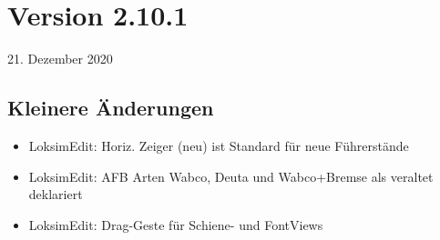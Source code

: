 \section{Version 2.10.1}\hfill 21. Dezember 2020

\subsection{Kleinere Änderungen}
\begin{itemize}
    \item LoksimEdit: Horiz. Zeiger (neu) ist Standard für neue Führerstände
    \item LoksimEdit: AFB Arten Wabco, Deuta und Wabco+Bremse als veraltet deklariert
    \item LoksimEdit: Drag-Geste für Schiene- und FontViews
\end{itemize}

